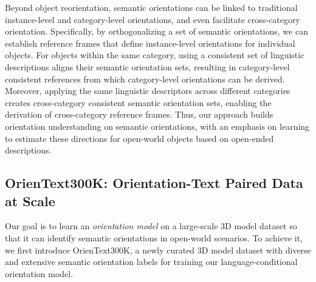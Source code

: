 Beyond object reorientation, semantic orientations can be linked to traditional instance-level and category-level orientations, and even facilitate cross-category orientation. Specifically, by orthogonalizing a set of semantic orientations, we can establish reference frames that define instance-level orientations for individual objects. For objects within the same category, using a consistent set of linguistic descriptions aligns their semantic orientation sets, resulting in category-level consistent references from which category-level orientations can be derived. Moreover, applying the same linguistic descriptors across different categories creates cross-category consistent semantic orientation sets, enabling the derivation of cross-category reference frames. Thus, our approach builds orientation understanding on semantic orientations, with an emphasis on learning to estimate these directions for open-world objects based on open-ended descriptions.



\subsection{OrienText300K: Orientation-Text Paired Data at Scale}
Our goal is to learn an \textit{orientation model} on a large-scale 3D model dataset so that it can identify semantic orientations in open-world scenarios.
To achieve it, we first introduce OrienText300K, a newly curated 3D model dataset with diverse and extensive semantic orientation labels for training our language-conditional orientation model.

